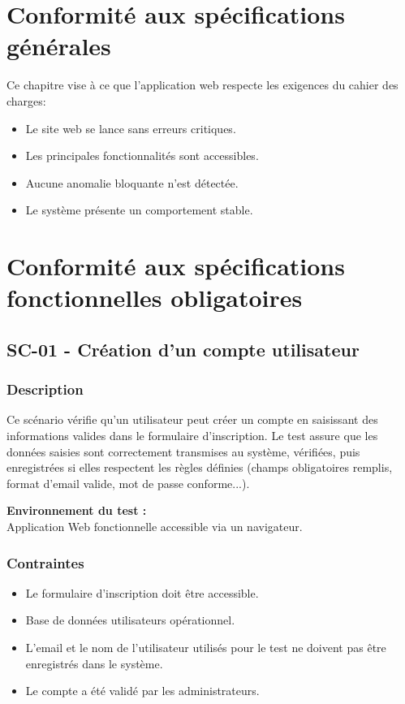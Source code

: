\documentclass[a4paper,12pt]{report}
\begin{document}
\chapter{Conformité aux spécifications générales}
Ce chapitre vise à ce que l'application web respecte les exigences du cahier des charges:
\begin{itemize}
    \item Le site web se lance sans erreurs critiques.
    \item Les principales fonctionnalités sont accessibles.
    \item Aucune anomalie bloquante n'est détectée.
    \item Le système présente un comportement stable.
\end{itemize}

\chapter{Conformité aux spécifications fonctionnelles obligatoires}

\section{SC-01 - Création d'un compte utilisateur}
\label{CU1}
\subsection*{Description}
Ce scénario vérifie qu’un utilisateur peut créer un compte en saisissant des informations valides dans le formulaire d’inscription.
Le test assure que les données saisies sont correctement transmises au système, vérifiées, puis enregistrées si elles respectent les règles définies (champs obligatoires remplis, format d’email valide, mot de passe conforme...).

\textbf{Environnement du test :}\\
Application Web fonctionnelle accessible via un navigateur.

\subsection*{Contraintes}
\begin{itemize}
    \item  Le formulaire d’inscription doit être accessible.
    \item Base de données utilisateurs opérationnel.
    \item L’email et le nom de l'utilisateur utilisés pour le test ne doivent pas être enregistrés dans le système.
    \item Le compte a été validé par les administrateurs.
\end{itemize}
\end{document}

